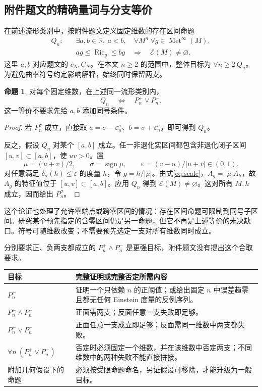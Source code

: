 \documentclass[11pt,a4paper]{article}
\theoremstyle{definition}
\newtheorem{proposition}[definition]{命题}
\newcommand{\Ric}{\operatorname{Ric}}
\newcommand{\Met}{\operatorname{Met}}
\newcommand{\Ein}{\mathcal E}
\begin{document}
\subsection{附件题文的精确量词与分支等价}

在前述流形类别中，按附件题文定义固定维数的存在区间命题
\begin{equation}\label{eq:Q}
\begin{split}
Q_n:\quad &\exists a,b\in\mathbb R,\ a<b,\quad
\forall M^n\ \forall g\in\Met^\infty(M),\\
&ag\le\Ric_g\le bg\quad\Longrightarrow\quad\Ein(M)\ne\varnothing.
\end{split}
\end{equation}
这里 $a,b$ 对应题文的 $c_N,C_N$。在本文 $n\ge2$ 的范围中，整体目标为 $\forall n\ge2\ Q_n$。为避免曲率符号约定影响解释，始终同时保留两支。

\begin{proposition}\label{prop:branches}
对每个固定维数，在上述同一流形类别内，
\[
Q_n\quad\Longleftrightarrow\quad P_n^+\vee P_n^-.
\]
这一等价不要求先给 $a,b$ 添加同号条件。
\end{proposition}
\begin{proof}
若 $P_n^\sigma$ 成立，直接取 $a=\sigma-\varepsilon_n^\sigma$、$b=\sigma+\varepsilon_n^\sigma$，即可得到 $Q_n$。

反之，假设 $Q_n$ 对某个 $[a,b]$ 成立。任一非退化实区间都包含非退化闭子区间 $[u,v]\subset[a,b]$，使 $uv>0$。置
\[
\mu=(u+v)/2,\qquad \sigma=\operatorname{sign}\mu,\qquad
\varepsilon=(v-u)/|u+v|\in(0,1).
\]
对任意满足 $\delta_\sigma(h)\le\varepsilon$ 的度量 $h$，令 $g=h/|\mu|$。由式\eqref{eq:scale}，$A_g=|\mu|A_h$，故 $A_g$ 的特征值位于 $[u,v]\subset[a,b]$。应用 $Q_n$ 得到 $\Ein(M)\ne\varnothing$。这对所有 $M,h$ 成立，因而给出 $P_n^\sigma$。
\end{proof}

这个论证也处理了允许零端点或跨零区间的情况：存在区间命题可限制到同号子区间。研究某个预先指定的含零区间仍是另一命题，但它不再是上述等价的未决缺口。符号可随维数改变；不需要预先选定一支对所有维数同时成立。

分别要求正、负两支都成立的 $P_n^+\wedge P_n^-$ 是更强目标，附件题文没有提出这个合取要求。

\begin{longtable}{P{0.31\textwidth}P{0.62\textwidth}}
\toprule
目标 & 完整证明或完整否定所需内容\\\midrule
$P_n^+$ & 证明一个只依赖 $n$ 的正阈值；或给出固定 $n$ 中误差趋零且都无任何 Einstein 度量的反例序列。\\
$P_n^+\wedge P_n^-$ & 正面需两支；反面任意一支失败即足够。\\
$P_n^+\vee P_n^-$ & 正面任意一支成立即足够；反面需同一维数中两支都失败。\\
$\forall n\ (P_n^+\vee P_n^-)$ & 否定时必须固定一个维数，并在该维数中否定两支；不同维数中的两种失败不能直接拼接。\\
附加几何假设下的命题 & 必须按受限命题命名，另证假设可移除，才能升级为一般目标。\\\bottomrule
\end{longtable}
\end{document}
